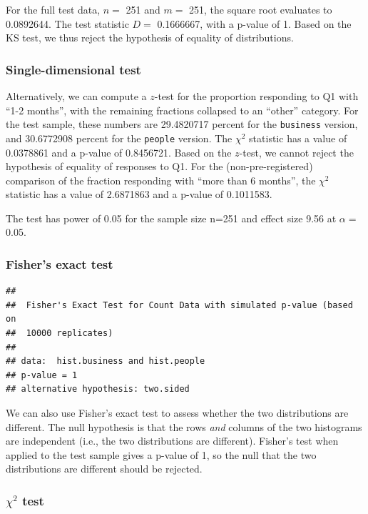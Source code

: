 \documentclass[
]{article}
\begin{document}
For the full test data, \(n=\) 251 and \(m=\) 251, the square root
evaluates to 0.0892644. The test statistic \(D=\) 0.1666667, with a
p-value of 1. Based on the KS test, we thus reject the hypothesis of
equality of distributions.

\hypertarget{single-dimensional-test}{%
\subsubsection{Single-dimensional test}\label{single-dimensional-test}}

Alternatively, we can compute a \(z\)-test for the proportion responding
to Q1 with ``1-2 months'', with the remaining fractions collapsed to an
``other'' category. For the test sample, these numbers are 29.4820717
percent for the \texttt{business} version, and 30.6772908 percent for
the \texttt{people} version. The \(\chi^2\) statistic has a value of
0.0378861 and a p-value of 0.8456721. Based on the \(z\)-test, we cannot
reject the hypothesis of equality of responses to Q1. For the
(non-pre-registered) comparison of the fraction responding with ``more
than 6 months'', the \(\chi^2\) statistic has a value of 2.6871863 and a
p-value of 0.1011583.

The test has power of 0.05 for the sample size n=251 and effect size
9.56 at \(\alpha =\) 0.05.

\hypertarget{fishers-exact-test}{%
\subsubsection{Fisher's exact test}\label{fishers-exact-test}}

\begin{verbatim}
## 
##  Fisher's Exact Test for Count Data with simulated p-value (based on
##  10000 replicates)
## 
## data:  hist.business and hist.people
## p-value = 1
## alternative hypothesis: two.sided
\end{verbatim}

We can also use Fisher's exact test to assess whether the two
distributions are different. The null hypothesis is that the rows
\emph{and} columns of the two histograms are independent (i.e., the two
distributions are different). Fisher's test when applied to the test
sample gives a p-value of 1, so the null that the two distributions are
different should be rejected.

\hypertarget{chi2-test}{%
\subsubsection{\texorpdfstring{\(\chi^2\)
test}{\textbackslash chi\^{}2 test}}\label{chi2-test}}
\end{document}
